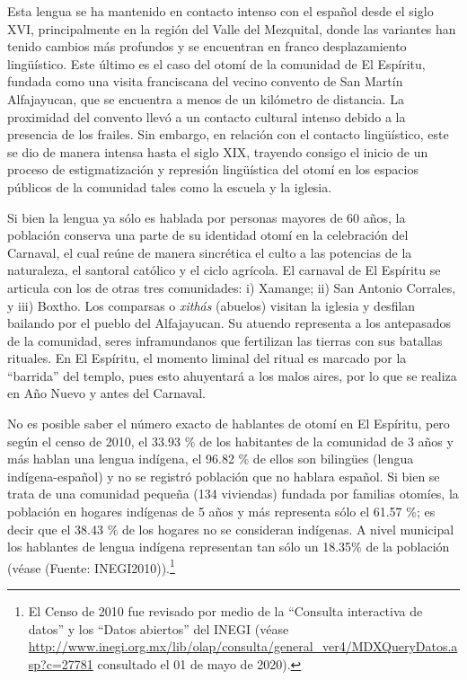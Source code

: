 \documentclass[output=paper]{../langscibook}
\begin{document}
Esta lengua se ha mantenido en contacto intenso con el español desde el siglo XVI, principalmente en la región del Valle del Mezquital, donde las variantes han tenido cambios más profundos y se encuentran en franco desplazamiento lingüístico. Este último es el caso del otomí de la comunidad de El Espíritu, fundada como una visita franciscana del vecino convento de San Martín Alfajayucan, que se encuentra a menos de un kilómetro de distancia. La proximidad del convento llevó a un contacto cultural intenso debido a la presencia de los frailes. Sin embargo, en relación con el contacto lingüístico, este se dio de manera intensa hasta el siglo XIX, trayendo consigo el inicio de un proceso de estigmatización y represión lingüística del otomí en los espacios públicos de la comunidad tales como la escuela y la iglesia.

Si bien la lengua ya sólo es hablada por personas mayores de 60 años, la población conserva una parte de su identidad otomí en la celebración del Carnaval, el cual reúne de manera sincrética el culto a las potencias de la naturaleza, el santoral católico y el ciclo agrícola. El carnaval de El Espíritu se articula con los de otras tres comunidades:
i) Xamange;
ii) San Antonio Corrales, y
iii) Boxtho. Los comparsas o \textit{xithás} (abuelos) visitan la iglesia y desfilan bailando por el pueblo del Alfajayucan. Su atuendo representa a los antepasados de la comunidad, seres inframundanos que fertilizan las tierras con sus batallas rituales. En El Espíritu, el momento liminal del ritual es marcado por la “barrida” del templo, pues esto ahuyentará a los malos aires, por lo que se realiza en Año Nuevo y antes del Carnaval.

No es posible saber el número exacto de hablantes de otomí en El Espíritu, pero según el censo de 2010, el 33.93 \% de los habitantes de la comunidad de 3 años y más hablan una lengua indígena, el 96.82 \% de ellos son bilingües (lengua indígena-español) y no se registró población que no hablara español. Si bien se trata de una comunidad pequeña (134 viviendas) fundada por familias otomíes, la población en hogares indígenas de 5 años y más representa sólo el 61.57 \%; es decir que el 38.43 \% de los hogares no se consideran indígenas. A nivel municipal los hablantes de lengua indígena representan tan sólo un 18.35\% de la población (véase  (Fuente: INEGI2010)).\footnote{El Censo de 2010 fue revisado por medio de la “Consulta interactiva de datos” y los “Datos abiertos” del INEGI (véase \url{http://www.inegi.org.mx/lib/olap/consulta/general\_ver4/MDXQueryDatos.asp?c=27781} consultado el 01 de mayo de 2020).}
\end{document}
